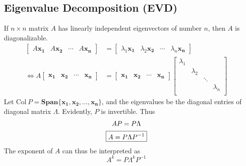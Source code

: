 \documentclass[11pt]{article}
\begin{document}
\subsection{Eigenvalue Decomposition (EVD)}
If $n \times n$ matrix $A$ has linearly independent eigenvectors of number $n$, then $A$ is diagonalizable.
\begin{equation}
\begin{aligned}
    \begin{bmatrix}
    A\bm{x_1} & A\bm{x_2} & \cdots & A\bm{x_n}
    \end{bmatrix} &= \begin{bmatrix}
    \lambda_1 \bm{x_1} & \lambda_2 \bm{x_2} & \cdots & \lambda_n \bm{x_n}
    \end{bmatrix} \\
    \Leftrightarrow A \begin{bmatrix}
    \bm{x_1} & \bm{x_2} & \cdots & \bm{x_n}
    \end{bmatrix} &= \begin{bmatrix}
    \bm{x_1} & \bm{x_2} & \cdots & \bm{x_n}
    \end{bmatrix} \begin{bmatrix}
    \lambda_1 & & \\
     & \lambda_2 & &  \\
     & & \ddots &  \\
     & & &  \lambda_n \\
    \end{bmatrix} 
\end{aligned}
\end{equation}
Let $\text{Col}~P = \bm{Span}\{\bm{x_1},\bm{x_2},\dots,\bm{x_n}\}$, and the eigenvalues be the diagonal entries of diagonal matrix $\Lambda$. Evidently, $P$ is invertible. Thus
\begin{gather}
    AP = P\Lambda \notag \\
    \boxed{A = P\Lambda P^{-1}}
\end{gather}
The exponent of $A$ can thus be interpreted as
\begin{equation}
    \boxed{A^{k} = P\Lambda^{k}P^{-1}}
\end{equation}
\end{document}
